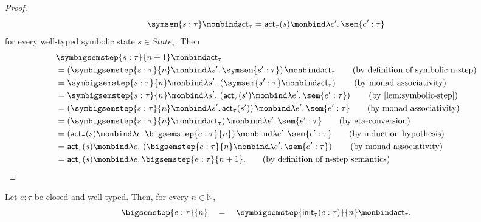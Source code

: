 \begin{proof}
  \begin{equation}
    \symsem{s : \tau}
    \monbind
    \mathsf{act}_\tau
    =
    \mathsf{act}_\tau(s)
    \monbind
    \lambda e'.\,\sem{e' : \tau}
  \end{equation}
  for every well-typed symbolic state $s \in State_\tau$. Then
  \begin{align}
    &\symbigsemstep{s : \tau}{n+1}
    \monbind
    \mathsf{act}_\tau \notag \\
    &=
    \left(
      \symbigsemstep{s : \tau}{n}
      \monbind
      \lambda s'.\,\symsem{s' : \tau}
    \right)
    \monbind
    \mathsf{act}_\tau
    \tag{\text{by definition of symbolic n-step}} \\
    &=
    \symbigsemstep{s : \tau}{n}
    \monbind
    \lambda s'.\,
      \left(\symsem{s' : \tau}
      \monbind \mathsf{act}_\tau\right)
    \tag{\text{by monad associativity}} \\
    &=
    \symbigsemstep{s : \tau}{n}
    \monbind
    \lambda s'.\,
      \left(\mathsf{act}_\tau(s')
      \monbind \lambda e'.\,\sem{e' : \tau}\right)
    \tag{\text{by \Cref{lem:symbolic-step}}} \\
    &=
    \left(
      \symbigsemstep{s : \tau}{n}
      \monbind
      \lambda s'.\,\mathsf{act}_\tau(s')
    \right)
    \monbind
    \lambda e'.\,\sem{e' : \tau}
    \tag{\text{by monad associativity}} \\
    &=
    \left(
      \symbigsemstep{s : \tau}{n}
      \monbind
      \mathsf{act}_\tau
    \right)
    \monbind
    \lambda e'.\,\sem{e' : \tau}
    \tag{\text{by eta-conversion}} \\
    &=
    \left(
      \mathsf{act}_\tau(s)
      \monbind
      \lambda e.\,\bigsemstep{e : \tau}{n}
    \right)
    \monbind
    \lambda e'.\,\sem{e' : \tau}
    \tag{\text{by induction hypothesis}} \\
    &=
    \mathsf{act}_\tau(s)
    \monbind
    \lambda e.\,
      \left(\bigsemstep{e : \tau}{n}
      \monbind
      \lambda e'.\,\sem{e' : \tau}\right)
    \tag{\text{by monad associativity}} \\
    &=
    \mathsf{act}_\tau(s)
    \monbind
    \lambda e.\,\bigsemstep{e : \tau}{n+1}.
    \tag{\text{by definition of n-step semantics}}
  \end{align}
\end{proof}

\begin{theorem}
  Let $e:\tau$ be closed and well typed. Then, for every
  $n\in\mathbb N$,
  \[
    \bigsemstep{e:\tau}{n}
    \quad
    =
    \quad
    \symbigsemstep{\mathsf{init}_\tau(e:\tau)}{n}
    \monbind
    \mathsf{act}_\tau.
  \]
\end{theorem}

